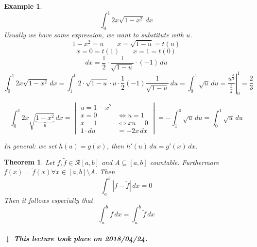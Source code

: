 \documentclass{article}
\newtheorem{theorem}{Theorem}  \numberwithin{theorem}{section}
\newtheorem{example}{Example}  \numberwithin{example}{section}
\newcommand{\card}[1]{\left|#1\right|}
\newcommand{\dateref}[1]{%
  \begin{mdframed}[backgroundcolor=gray!10,innerbottommargin=0pt,innertopmargin=0pt]
    \paragraph{\textit{$\downarrow$ This lecture took place on #1.}}%
  \end{mdframed}%
}
\begin{document}
\begin{example}
  \[ \int_0^1 2x \sqrt{1 - x^2} \, dx \]
  Usually we have some expression, we want to substitute with $u$.
  \[ 1 - x^2 = u \qquad x = \sqrt{1 - u} = t(u) \]
  \[ x = 0 = t(1) \qquad x = 1 = t(0) \]
  \[ dx = \frac12 \cdot \frac{1}{\sqrt{1 - u}} \cdot (-1) \, du \]
  \[ \int_0^1 2x \sqrt{1 - x^2} \, dx = \int_1^0 2 \cdot \sqrt{1 - u} \cdot u \cdot \frac12 (-1) \frac{1}{\sqrt{1 - u}} \, du = \int_0^1 \sqrt{u} \, du = \left. \frac{u^{\frac32}}{\frac32} \right|_0^1 = \frac23 \]

  \[
    \int_0^1 2x \sqrt{\underbrace{1 - x^2}_{u}} \, dx =
    \begin{vmatrix}
      u = 1 - x^2 & \\
      x = 0 & \Leftrightarrow u = 1 \\
      x = 1 & \Leftrightarrow xu = 0 \\
      1 \cdot du &= -2x \, dx
    \end{vmatrix}
    = -\int_1^0 \sqrt{u} \, du = \int_0^1 \sqrt{u} \, du
  \]

  In general: we set $h(u) = g(x)$, then $h'(u) \, du = g'(x) \, dx$.
\end{example}

\begin{theorem} %
  \label{satz7countable}
  Let $f, \tilde f \in \mathcal R[a,b]$ and $A \subseteq [a,b]$ countable.
  Furthermore $f(x) = \tilde f(x) \forall x \in [a,b] \setminus A$.
  Then
  \[ \int_a^b \card{f - \tilde f} \, dx = 0 \]
  Then it follows especially that
  \[ \int_a^b f \, dx = \int_a^b \tilde f \, dx \]
\end{theorem}

\dateref{2018/04/24}
\end{document}
